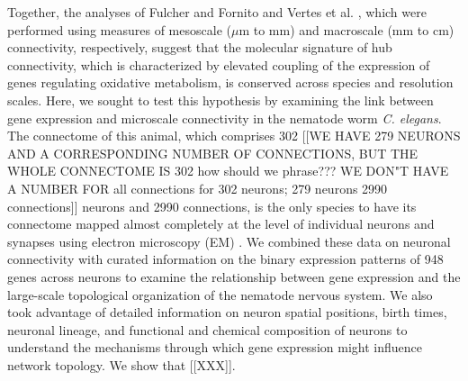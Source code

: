 \documentclass[10pt,letterpaper]{article}
\begin{document}
Together, the analyses of Fulcher and Fornito \cite{Fulcher:2016ck} and Vertes et al. \cite{Vertes2016a}, which were performed using measures of mesoscale ($\mu$m to mm) and macroscale (mm to cm) connectivity, respectively, suggest that the molecular signature of hub connectivity, which is characterized by elevated coupling of the expression of genes regulating oxidative metabolism, is conserved across species and resolution scales.
Here, we sought to test this hypothesis by examining the link between gene expression and microscale connectivity in the nematode worm \emph{C. elegans}.
The connectome of this animal, which comprises 302 [[WE HAVE 279 NEURONS AND A CORRESPONDING NUMBER OF CONNECTIONS, BUT THE WHOLE CONNECTOME IS 302 how should we phrase??? WE DON"T HAVE A NUMBER FOR all connections for 302 neurons; 279 neurons 2990 connections]] neurons and 2990 connections, is the only species to have its connectome mapped almost completely at the level of individual neurons and synapses using electron microscopy (EM) \cite{White:1986tx, Varshney2011}.
We combined these data on neuronal connectivity with curated information on the binary expression patterns of 948 genes across neurons to examine the relationship between gene expression and the large-scale topological organization of the nematode nervous system.
We also took advantage of detailed information on neuron spatial positions, birth times, neuronal lineage, and functional and chemical composition of neurons to understand the mechanisms through which gene expression might influence network topology.
We show that [[XXX]].
\end{document}
